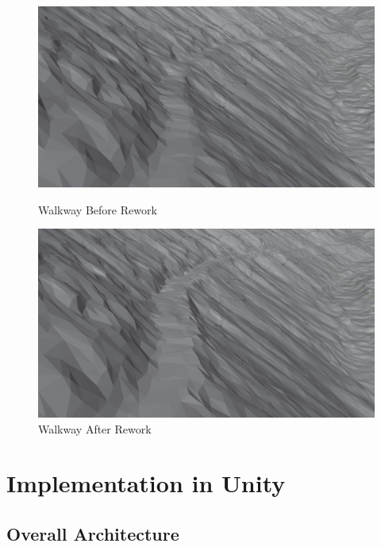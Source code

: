         \FloatBarrier
        \begin{figure}[htbp]
            \centering
            \begin{minipage}[b]{0.4195\textwidth}
                \includegraphics[width=\textwidth]{figures/walkway_before_rework.PNG}
                \caption{Walkway Before Rework}
            \end{minipage}
            \begin{minipage}[b]{0.4\textwidth}
                \includegraphics[width=\textwidth]{figures/walkway_after_rework.PNG}
                \caption{Walkway After Rework}
            \end{minipage}
        \end{figure}
        \FloatBarrier

\section{Implementation in Unity}
    \subsection{Overall Architecture}
    
